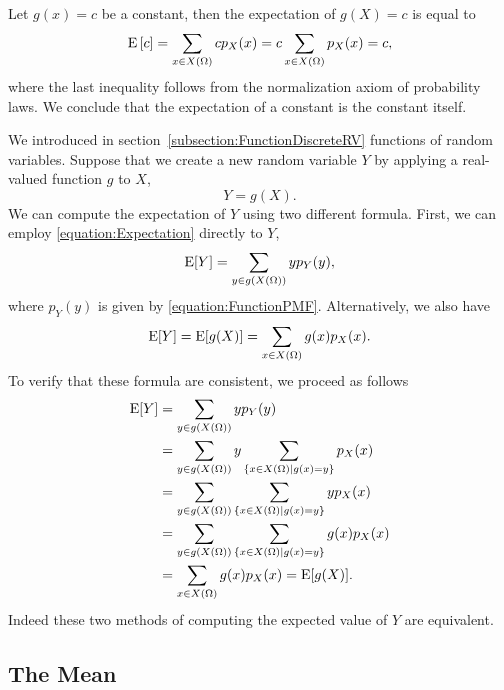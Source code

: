 \begin{example}
Let $g(x) = c$ be a constant, then the expectation of $g(X) = c$ is equal to
\begin{equation*}
\mathrm{E} \left[ c \right]
= \sum_{x \in X(\Omega)} c p_X (x)
= c \sum_{x \in X(\Omega)} p_X (x)
= c,
\end{equation*}
where the last inequality follows from the normalization axiom of probability laws.
We conclude that the expectation of a constant is the constant itself.
\end{example}

We introduced in section~\ref{subsection:FunctionDiscreteRV} functions of random variables.
Suppose that we create a new random variable $Y$ by applying a real-valued function $g$ to $X$,
\begin{equation*}
Y = g(X) .
\end{equation*}
We can compute the expectation of $Y$ using two different formula.
First, we can employ \eqref{equation:Expectation} directly to $Y$,
\begin{equation*}
\mathrm{E} [Y] = \sum_{y \in g(X(\Omega))} y p_Y(y),
\end{equation*}
where $p_Y (y)$ is given by \eqref{equation:FunctionPMF}.
Alternatively, we also have
\begin{equation*}
\mathrm{E} [Y] = \mathrm{E} [g(X)] = \sum_{x \in X(\Omega)} g(x) p_X(x) .
\end{equation*}
To verify that these formula are consistent, we proceed as follows
\begin{equation*}
\begin{split}
\mathrm{E} [Y] &= \sum_{y \in g(X(\Omega))} y p_Y(y) \\
&= \sum_{y \in g(X(\Omega))} y
\sum_{\{x \in X(\Omega) | g(x) = y\}} p_X(x) \\
&= \sum_{y \in g(X(\Omega))}
\sum_{\{x \in X(\Omega) | g(x) = y\}} y p_X(x) \\
&= \sum_{y \in g(X(\Omega))}
\sum_{\{x \in X(\Omega) | g(x) = y\}} g(x) p_X(x) \\
&= \sum_{x \in X(\Omega)} g(x) p_X(x)
= \mathrm{E} [g(X)].
\end{split}
\end{equation*}
Indeed these two methods of computing the expected value of $Y$ are equivalent.


\subsection{The Mean}

